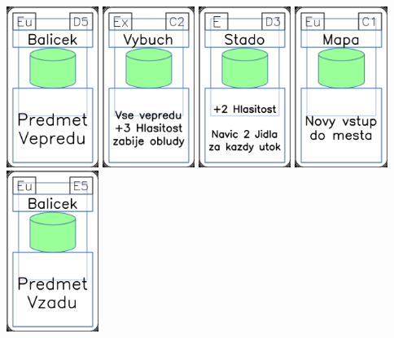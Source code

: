 \documentclass[a4paper]{article}
\begin{document}
	\includegraphics[width=3.0cm]{img-4_19}
	\includegraphics[width=3.0cm]{img-4_11}
	\includegraphics[width=3.0cm]{img-4_47}
	\includegraphics[width=3.0cm]{img-4_40}
	\includegraphics[width=3.0cm]{img-4_24}
\end{document}
